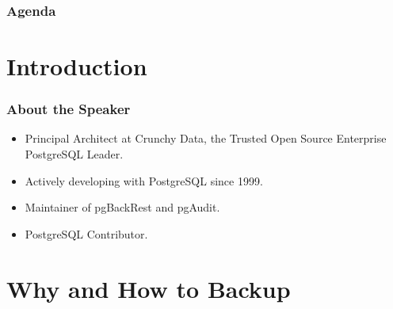 %
\def\mytitle{Backup Best Practices\\with pgBackRest}
\def\mysubject{}
\def\myevent{PostgresConf.CN \& PGConf.Asia}
\def\myauthor{David Steele}
\def\myemail{}
\def\mydate{November 20, 2020}

\def\mysuppressnav{}

\def\mytemplatepath{/template/}


\begin{frame}
    \frametitle{Agenda}
    \tableofcontents
\end{frame}

\section{Introduction}

\begin{frame}
    \frametitle{About the Speaker}

    \begin{itemize}
        \item Principal Architect at Crunchy Data, the Trusted Open Source Enterprise PostgreSQL Leader.
        \item Actively developing with PostgreSQL since 1999.
        \item Maintainer of pgBackRest and pgAudit.
        \item PostgreSQL Contributor.
    \end{itemize}
\end{frame}

\section{Why and How to Backup}

